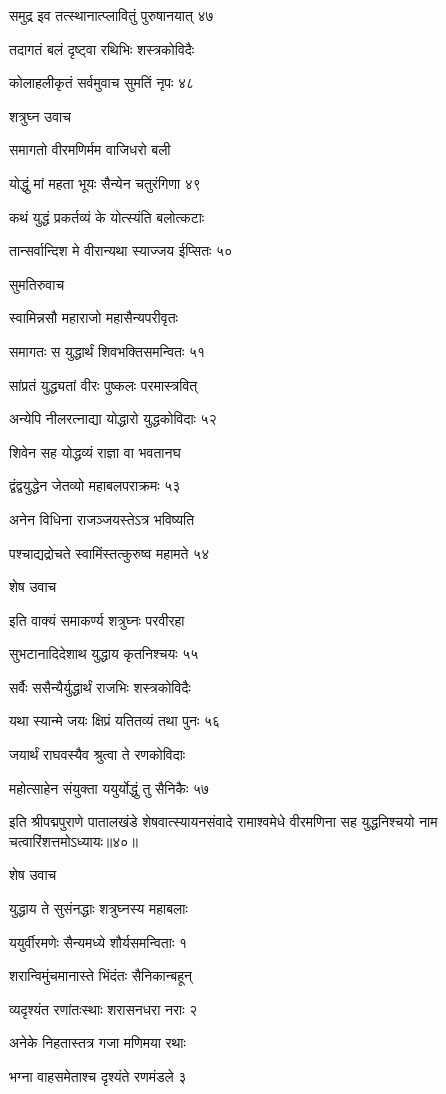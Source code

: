 समुद्र इव तत्स्थानात्प्लावितुं पुरुषानयात् ४७

तदागतं बलं दृष्ट्वा रथिभिः शस्त्रकोविदैः

कोलाहलीकृतं सर्वमुवाच सुमतिं नृपः ४८

शत्रुघ्न उवाच

समागतो वीरमणिर्मम वाजिधरो बली

योद्धुं मां महता भूयः सैन्येन चतुरंगिणा ४९

कथं युद्धं प्रकर्तव्यं के योत्स्यंति बलोत्कटाः

तान्सर्वान्दिश मे वीरान्यथा स्याज्जय ईप्सितः ५०

सुमतिरुवाच

स्वामिन्नसौ महाराजो महासैन्यपरीवृतः

समागतः स युद्धार्थं शिवभक्तिसमन्वितः ५१

सांप्रतं युद्ध्यतां वीरः पुष्कलः परमास्त्रवित्

अन्येपि नीलरत्नाद्या योद्धारो युद्धकोविदाः ५२

शिवेन सह योद्धव्यं राज्ञा वा भवतानघ

द्वंद्वयुद्धेन जेतव्यो महाबलपराक्रमः ५३

अनेन विधिना राजञ्जयस्तेऽत्र भविष्यति

पश्चाद्यद्रोचते स्वामिंस्तत्कुरुष्व महामते ५४

शेष उवाच

इति वाक्यं समाकर्ण्य शत्रुघ्नः परवीरहा

सुभटानादिदेशाथ युद्धाय कृतनिश्चयः ५५

सर्वैः ससैन्यैर्युद्धार्थं राजभिः शस्त्रकोविदैः

यथा स्यान्मे जयः क्षिप्रं यतितव्यं तथा पुनः ५६

जयार्थं राघवस्यैव श्रुत्वा ते रणकोविदाः

महोत्साहेन संयुक्ता ययुर्योद्धुं तु सैनिकैः ५७

इति श्रीपद्मपुराणे पातालखंडे शेषवात्स्यायनसंवादे रामाश्वमेधे वीरमणिना सह युद्धनिश्चयो नाम चत्वारिंशत्तमोऽध्यायः॥४०॥


शेष उवाच

युद्धाय ते सुसंनद्धाः शत्रुघ्नस्य महाबलाः

ययुर्वीरमणेः सैन्यमध्ये शौर्यसमन्विताः १

शरान्विमुंचमानास्ते भिंदंतः सैनिकान्बहून्

व्यदृश्यंत रणांतःस्थाः शरासनधरा नराः २

अनेके निहतास्तत्र गजा मणिमया रथाः

भग्ना वाहसमेताश्च दृश्यंते रणमंडले ३

